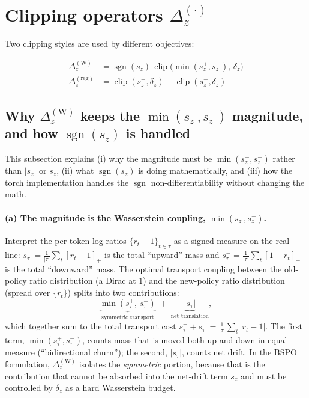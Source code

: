 \documentclass{article}
\DeclareMathOperator*{\clip}{clip}
\begin{document}
\section{Clipping operators \texorpdfstring{$\Delta_z^{(\cdot)}$}{Delta}}

Two clipping styles are used by different objectives:

\begin{align*}
\Delta_z^{(\text{W})}   &= \operatorname{sgn}(s_z)\,\clip\!\bigl(\min(s_z^{+},s_z^{-}),\,\delta_z\bigr) \\
\Delta_z^{(\text{reg})} &= \clip(s_z^{+},\delta_z) - \clip(s_z^{-},\delta_z)
\end{align*}

\subsection*{Why \texorpdfstring{$\Delta_z^{(\text{W})}$}{Delta\^{}W} keeps the $\min(s_z^+, s_z^-)$ magnitude, and how $\operatorname{sgn}(s_z)$ is handled}

This subsection explains (i) why the magnitude must be
$\min(s_z^+, s_z^-)$ rather than $|s_z|$ or $s_z$, (ii) what $\operatorname{sgn}(s_z)$ is doing
mathematically, and (iii) how the torch implementation handles the
$\operatorname{sgn}$ non-differentiability without changing the math.

\paragraph{(a) The magnitude is the Wasserstein coupling, $\min(s_z^+,s_z^-)$.}
Interpret the per-token log-ratios $\{r_t - 1\}_{t\in\tau}$ as a signed
measure on the real line: $s_\tau^+ = \tfrac{1}{|\tau|}\sum_t[r_t-1]_+$
is the total ``upward'' mass and $s_\tau^- = \tfrac{1}{|\tau|}\sum_t[1-r_t]_+$
is the total ``downward'' mass. The optimal transport coupling between
the old-policy ratio distribution (a Dirac at $1$) and the new-policy
ratio distribution (spread over $\{r_t\}$) splits into two contributions:
\[
\underbrace{\min(s_\tau^+,\,s_\tau^-)}_{\text{symmetric transport}}
\;+\;
\underbrace{|s_\tau|}_{\text{net translation}},
\]
which together sum to the total transport cost $s_\tau^+ + s_\tau^- =
\tfrac{1}{|\tau|}\sum_t|r_t-1|$. The first term, $\min(s_\tau^+,s_\tau^-)$,
counts mass that is moved both up and down in equal measure
(``bidirectional churn''); the second, $|s_\tau|$, counts net drift. In
the BSPO formulation, $\Delta_z^{(\text{W})}$ isolates the \emph{symmetric}
portion, because that is the contribution that cannot be absorbed into
the net-drift term $s_z$ and must be controlled by $\delta_z$ as a
hard Wasserstein budget.
\end{document}
